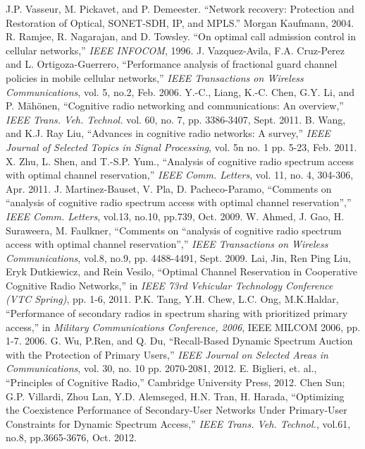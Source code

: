 \begin{thebibliography}{1}
 J.P. Vasseur, M. Pickavet, and P. Demeester. ``Network recovery: Protection and Restoration of Optical, SONET-SDH, IP, and MPLS.'' Morgan Kaufmann, 2004.
 R. Ramjee, R. Nagarajan, and D. Towsley. ``On optimal call admission
control in cellular networks,'' \emph{IEEE INFOCOM}, 1996.
 J. Vazquez-Avila, F.A. Cruz-Perez and L. Ortigoza-Guerrero, ``Performance analysis of fractional guard channel policies in mobile
cellular networks,'' \emph{IEEE Transactions on Wireless Communications}, vol. 5, no.2, Feb. 2006.
 Y.-C., Liang, K.-C. Chen, G.Y. Li, and P. Mähönen, ``Cognitive radio networking and communications: An overview,''\emph{ IEEE Trans. Veh. Technol.} vol. 60, no. 7, pp. 3386-3407, Sept. 2011.
 B. Wang, and K.J. Ray Liu, ``Advances in cognitive radio networks: A survey,'' \emph{IEEE Journal of Selected Topics in Signal Processing}, vol. 5n no. 1 pp. 5-23, Feb. 2011.
 X. Zhu, L. Shen, and T.-S.P. Yum., ``Analysis of cognitive radio spectrum access with optimal channel reservation,'' \emph{IEEE  Comm. Letters}, vol. 11, no. 4, 304-306, Apr. 2011.
 J. Martinez-Bauset, V. Pla, D. Pacheco-Paramo, ``Comments on ``analysis of cognitive radio spectrum access with optimal channel reservation'','' \emph{IEEE  Comm. Letters}, vol.13, no.10, pp.739, Oct. 2009.
 W. Ahmed, J. Gao, H. Suraweera, M. Faulkner, ``Comments on ``analysis of cognitive radio spectrum access with optimal channel reservation'','' \emph{IEEE Transactions on Wireless Communications}, vol.8, no.9, pp. 4488-4491, Sept. 2009.
 Lai, Jin, Ren Ping Liu, Eryk Dutkiewicz, and Rein Vesilo, ``Optimal Channel Reservation in Cooperative Cognitive Radio Networks,'' in \emph{IEEE 73rd Vehicular Technology Conference (VTC Spring)}, pp. 1-6, 2011.
 P.K. Tang, Y.H. Chew, L.C. Ong, M.K.Haldar, ``Performance of secondary radios in spectrum sharing with prioritized primary access,'' in \emph{Military Communications Conference, 2006}, IEEE MILCOM 2006, pp. 1-7. 2006.
 G. Wu, P.Ren, and Q. Du, ``Recall-Based Dynamic Spectrum Auction with the Protection of Primary Users,'' \emph{IEEE Journal on Selected Areas in Communications}, vol. 30, no. 10 pp. 2070-2081, 2012.
 E. Biglieri, et. al., ``Principles of Cognitive Radio,'' Cambridge University Press, 2012.
 Chen Sun; G.P. Villardi, Zhou Lan, Y.D. Alemseged, H.N. Tran, H. Harada,  ``Optimizing the Coexistence Performance of Secondary-User Networks Under Primary-User Constraints for Dynamic Spectrum Access,''\emph{ IEEE Trans. Veh. Technol.}, vol.61, no.8, pp.3665-3676, Oct. 2012.

\end{thebibliography}
